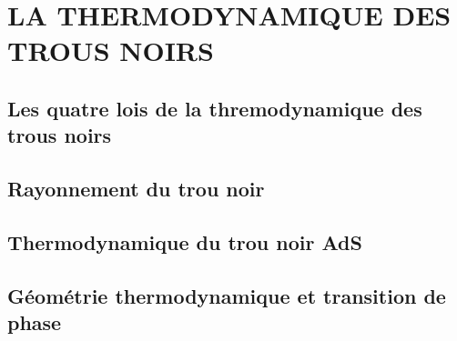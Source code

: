 \documentclass[11pt,aspectratio=169]{beamer}
\begin{document}
\section{ LA THERMODYNAMIQUE DES TROUS	NOIRS}

\subsection{Les quatre lois de la thremodynamique des trous noirs}

\subsection{Rayonnement du trou noir}

\subsection{Thermodynamique du trou noir  AdS}

	
\subsection{Géométrie thermodynamique et transition de phase}












\end{document}
